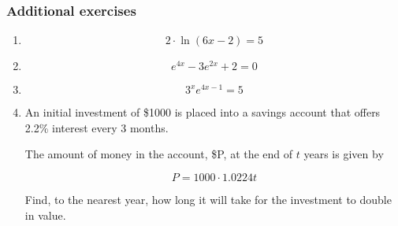 \subsubsection{Additional exercises}\label{subsec:additional_log}

\begin{enumerate}
\item  
\begin{equation*}
2\cdot \ln(6x - 2) = 5
\end{equation*}

\item 
\begin{equation*}
e^{4x} - 3e^{2x} + 2 = 0
\end{equation*}

\item 
\begin{equation*}
3^xe^{4x-1} = 5
\end{equation*}

\item 

An initial investment of \$1000 is placed into a savings account that offers 2.2\% interest
every 3 months. 

The amount of money in the account, \$P, at the end of $t$ years is given by 

\begin{equation*}
P = 1000 \cdot 1.0224t
\end{equation*}

Find, to the nearest year, how long it will take for the investment to double in value. 


\end{enumerate}

\pagebreak


